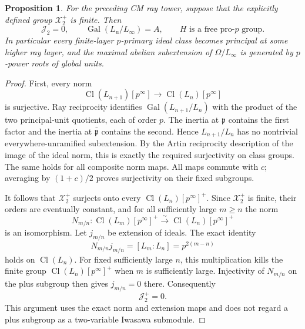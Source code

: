 \documentclass[11pt]{article}
\newtheorem{proposition}[theorem]{Proposition}
\theoremstyle{definition}\newtheorem{definition}[theorem]{Definition}
\begin{document}
\begin{proposition}\label{prop:cm-finite-plus-free}
For the preceding CM ray tower, suppose that the explicitly
defined group \(\mathcal X_2^+\) is finite.
Then
\[
 \mathcal J_2=0,\qquad
 \operatorname{Gal}(L_{\mathrm u}/L_\infty)=A,
 \qquad H\text{ is a free pro-}p\text{ group}.
\]
In particular every finite-layer \(p\)-primary ideal class becomes principal
at some higher ray layer, and the maximal abelian subextension
of \(\Omega/L_\infty\) is generated by \(p\)-power roots of
global units.
\end{proposition}

\begin{proof}
First, every norm
\[
 \operatorname{Cl}(L_{n+1})[p^\infty]
           \longrightarrow\operatorname{Cl}(L_n)[p^\infty]
\]
is surjective.
Ray reciprocity identifies
\(\operatorname{Gal}(L_{n+1}/L_n)\) with the product of the
two principal-unit quotients, each of order \(p\).
The inertia at \(\mathfrak p\) contains the first factor and
the inertia at \(\bar{\mathfrak p}\) contains the second.
Hence \(L_{n+1}/L_n\) has no nontrivial everywhere-unramified
subextension.
By the Artin reciprocity description of the image of the ideal
norm, this is exactly the required surjectivity on class groups.
The same holds for all composite norm maps.
All maps commute with \(c\); averaging by \((1+c)/2\) proves
surjectivity on their fixed subgroups.

It follows that \(\mathcal X_2^+\) surjects onto every
\(\operatorname{Cl}(L_n)[p^\infty]^+\).
Since \(\mathcal X_2^+\) is finite, their orders are eventually
constant, and for all sufficiently large \(m\geq n\) the norm
\[
 N_{m/n}:\operatorname{Cl}(L_m)[p^\infty]^+
                       \xrightarrow{\sim}
                         \operatorname{Cl}(L_n)[p^\infty]^+
\]
is an isomorphism.
Let \(j_{m/n}\) be extension of ideals.
The exact identity
\[
                  N_{m/n}j_{m/n}=[L_m:L_n]
                               =p^{2(m-n)}
\]
holds on \(\operatorname{Cl}(L_n)\).
For fixed sufficiently large \(n\), this multiplication kills
the finite group \(\operatorname{Cl}(L_n)[p^\infty]^+\) when
\(m\) is sufficiently large.
Injectivity of \(N_{m/n}\) on the plus subgroup then gives
\(j_{m/n}=0\) there.
Consequently
\begin{equation}\label{eq:cm-direct-limit-plus-zero}
                         \mathcal J_2^+=0.
\end{equation}
This argument uses the exact norm and extension maps and does not
regard a plus subgroup as a two-variable Iwasawa submodule.


\end{proof}
\end{document}
